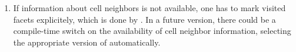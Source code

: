 \begin{enumerate}
\item {}
If information about cell neighbors is not available, 
one has to mark visited facets explicitely,
which is done by .
In a future version, there could be a compile-time switch on the
availability of cell neighbor information, 
selecting the appropriate version of 
automatically.
\end{enumerate}
~

